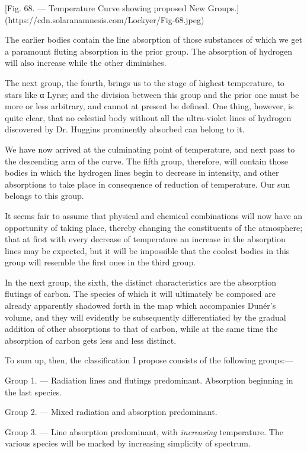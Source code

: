 \documentclass[a4paper, 12pt, oneside, polutonikogreek, english]{article}
\begin{document}
[Fig. 68. --- Temperature Curve showing proposed New Groups.](https://cdn.solaranamnesis.com/Lockyer/Fig-68.jpeg)

The earlier bodies contain the line absorption of those substances of which we get a paramount fluting absorption in the prior group. The absorption of hydrogen will also increase while the other diminishes.

The next group, the fourth, brings us to the stage of highest temperature, to stars like α Lyræ; and the division between this group and the prior one must be more or less arbitrary, and cannot at present be defined. One thing, however, is quite clear, that no celestial body without all the ultra-violet lines of hydrogen discovered by Dr. Huggins prominently absorbed can belong to it.

We have now arrived at the culminating point of temperature, and next pass to the descending arm of the curve. The fifth group, therefore, will contain those bodies in which the hydrogen lines begin to decrease in intensity, and other absorptions to take place in consequence of reduction of temperature. Our sun belongs to this group.

It seems fair to assume that physical and chemical combinations will now have an opportunity of taking place, thereby changing the constituents of the atmosphere; that at first with every decrease of temperature an increase in the absorption lines may be expected, but it will be impossible that the coolest bodies in this group will resemble the first ones in the third group.

In the next group, the sixth, the distinct characteristics are the absorption flutings of carbon. The species of which it will ultimately be composed are already apparently shadowed forth in the map which accompanies Dunér's volume, and they will evidently be subsequently differentiated by the gradual addition of other absorptions to that of carbon, while at the same time the absorption of carbon gets less and less distinct.

To sum up, then, the classification I propose consists of the following groups:---

Group 1. --- Radiation lines and flutings predominant. Absorption beginning in the last species.

Group 2. --- Mixed radiation and absorption predominant.

Group 3. --- Line absorption predominant, with \emph{increasing} temperature. The various species will be marked by increasing simplicity of spectrum.
\end{document}
